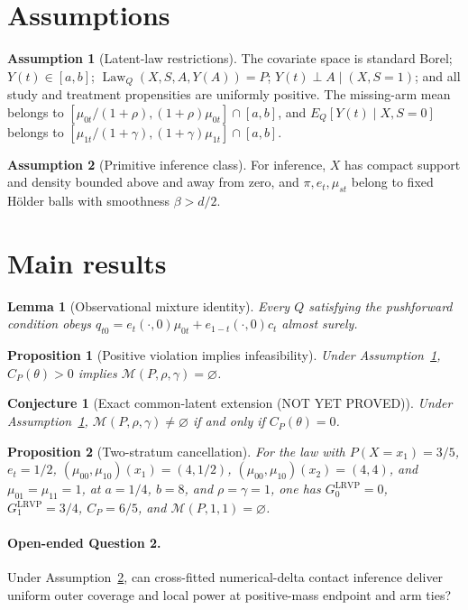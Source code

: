\documentclass[11pt]{article}
\theoremstyle{definition}
\newtheorem{assumption}{Assumption}
\theoremstyle{plain}
\newtheorem{conjecture}{Conjecture}
\newtheorem{proposition}{Proposition}
\newtheorem{lemma}{Lemma}
\theoremstyle{remark}
\begin{document}
\section{Assumptions}
\begin{assumption}[Latent-law restrictions]\label{ass:latent}
The covariate space is standard Borel; $Y(t)\in[a,b]$; $\operatorname{Law}_Q(X,S,A,Y(A))=P$; $Y(t)\perp A\mid(X,S=1)$; and all study and treatment propensities are uniformly positive.  The missing-arm mean belongs to $[\mu_{0t}/(1+\rho),(1+\rho)\mu_{0t}]\cap[a,b]$, and $E_Q[Y(t)\mid X,S=0]$ belongs to $[\mu_{1t}/(1+\gamma),(1+\gamma)\mu_{1t}]\cap[a,b]$.
\end{assumption}

\begin{assumption}[Primitive inference class]\label{ass:primitive}
For inference, $X$ has compact support and density bounded above and away from zero, and $\pi,e_t,\mu_{st}$ belong to fixed Hölder balls with smoothness $\beta>d/2$.
\end{assumption}

\section{Main results}
\begin{lemma}[Observational mixture identity]\label{lem:mixture}
Every $Q$ satisfying the pushforward condition obeys $q_{t0}=e_t(\cdot,0)\mu_{0t}+e_{1-t}(\cdot,0)c_t$ almost surely.
\end{lemma}
\begin{proposition}[Positive violation implies infeasibility]\label{prop:infeasible}
Under Assumption~\ref{ass:latent}, $C_P(\theta)>0$ implies $\mathcal M(P,\rho,\gamma)=\varnothing$.
\end{proposition}
\begin{conjecture}[Exact common-latent extension (NOT YET PROVED)]\label{conj:exact}
Under Assumption~\ref{ass:latent}, $\mathcal M(P,\rho,\gamma)\ne\varnothing$ if and only if $C_P(\theta)=0$.
\end{conjecture}
\begin{proposition}[Two-stratum cancellation]\label{prop:cancel}
For the law with $P(X=x_1)=3/5$, $e_t=1/2$, $(\mu_{00},\mu_{10})(x_1)=(4,1/2)$, $(\mu_{00},\mu_{10})(x_2)=(4,4)$, and $\mu_{01}=\mu_{11}=1$, at $a=1/4$, $b=8$, and $\rho=\gamma=1$, one has $G_0^{\mathrm{LRVP}}=0$, $G_1^{\mathrm{LRVP}}=3/4$, $C_P=6/5$, and $\mathcal M(P,1,1)=\varnothing$.
\end{proposition}
\paragraph{Open-ended Question 2.} Under Assumption~\ref{ass:primitive}, can cross-fitted numerical-delta contact inference deliver uniform outer coverage and local power at positive-mass endpoint and arm ties?
\end{document}
